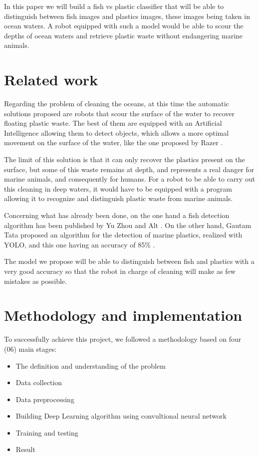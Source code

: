 \documentclass[a4paper, 12pt]{report}
\begin{document}
In this paper we will build a fish vs plastic classifier that will be able to distinguish between fish images and plastics images, these images being taken in ocean waters. A robot equipped with such a model would be able to scour the depths of ocean waters and retrieve plastic waste without endangering marine animals. 

\section{Related work}

Regarding the problem of cleaning the oceans, at this time the automatic solutions proposed are robots that scour the surface of the water to recover floating plastic waste. The best of them are equipped with an Artificial Intelligence allowing them to detect objects, which allows a more optimal movement on the surface of the water, like the one proposed by Razer \cite{razer_bot}. 

The limit of this solution is that it can only recover the plastics present on the surface, but some of this waste remains at depth, and represents a real danger for marine animals, and consequently for humans. For a robot to be able to carry out this cleaning in deep waters, it would have to be equipped with a program allowing it to recognize and distinguish plastic waste from marine animals. 

Concerning what has already been done, on the one hand a fish detection algorithm has been published by Yu Zhou and Alt \cite{fish_detection}. On the other hand, Gautam Tata proposed an algorithm for the detection of marine plastics, realized with YOLO, and this one having an accuracy of 85\% \cite{plastic_detection}. 

The model we propose will be able to distinguish between fish and plastics with a very good accuracy so that the robot in charge of cleaning will make as few mistakes as possible.

\section{Methodology and implementation}

To successfully achieve this project, we followed a methodology based on four (06) main stages:

\begin{itemize}

    \item The definition and understanding of the problem

    \item Data collection
    
    \item Data preprocessing

    \item Building Deep Learning algorithm using convultional neural network

    \item Training and testing

    \item Result
    
\end{itemize}
\end{document}
